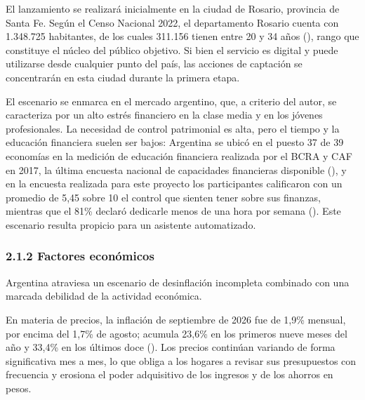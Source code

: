 El lanzamiento se realizará inicialmente en la ciudad de Rosario,
provincia de Santa Fe. Según el Censo Nacional 2022, el departamento
Rosario cuenta con 1.348.725 habitantes, de los cuales 311.156 tienen
entre 20 y 34 años (), rango
que constituye el núcleo del público objetivo. Si bien el servicio es
digital y puede utilizarse desde cualquier punto del país, las acciones
de captación se concentrarán en esta ciudad durante la primera etapa.

El escenario se enmarca en el mercado argentino, que, a criterio del
autor, se caracteriza por un alto estrés financiero en la clase media y
en los jóvenes profesionales. La necesidad de control patrimonial es
alta, pero el tiempo y la educación financiera suelen ser bajos:
Argentina se ubicó en el puesto 37 de 39 economías en la medición de
educación financiera realizada por el BCRA y CAF en 2017, la última
encuesta nacional de capacidades financieras disponible
(), y en la encuesta
realizada para este proyecto los participantes calificaron con un
promedio de 5,45 sobre 10 el control que sienten tener sobre sus
finanzas, mientras que el 81\% declaró dedicarle menos de una hora por
semana (). Este
escenario resulta propicio para un asistente automatizado.

\subsubsection*{2.1.2 Factores económicos}\label{factores-econuxf3micos}

Argentina atraviesa un escenario de desinflación incompleta combinado
con una marcada debilidad de la actividad económica.

En materia de precios, la inflación de septiembre de 2026 fue de 1,9\%
mensual, por encima del 1,7\% de agosto; acumula 23,6\% en los primeros
nueve meses del año y 33,4\% en los últimos doce
(). Los precios continúan variando de forma significativa mes a
mes, lo que obliga a los hogares a revisar sus presupuestos con
frecuencia y erosiona el poder adquisitivo de los ingresos y de los
ahorros en pesos.

